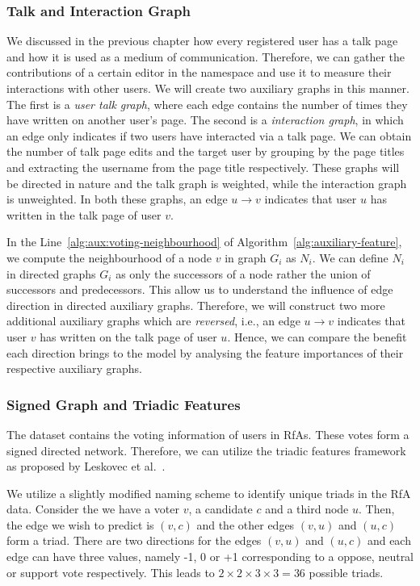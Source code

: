 \subsubsection{Talk and Interaction Graph}
\label{subsec:talk-interaction-graph}
We discussed in the previous chapter how every registered user has a talk page and how it is used as a medium of communication. 
Therefore, we can gather the contributions of a certain editor in the \usertalkNS namespace and use it to measure their interactions with other users.
We will create two auxiliary graphs in this manner.
The first is a \textit{user talk graph}, where each edge contains the number of times they have written on another user's page.
The second is a \textit{interaction graph}, in which an edge only indicates if two users have interacted via a talk page. 
We can obtain the number of talk page edits and the target user by grouping by the page titles and extracting the username from the page title respectively. 
These graphs will be directed in nature and the talk graph is weighted, while the interaction graph is unweighted. 
In both these graphs, an edge $u \rightarrow v$ indicates that user $u$ has written in the talk page of user $v$.

In the Line~\ref{alg:aux:voting-neighbourhood} of Algorithm~\ref{alg:auxiliary-feature}, we compute the neighbourhood of a node $v$ in graph $G_i$ as $N_i$.
We can define $N_i$ in directed graphs $G_i$ as only the successors of a node rather the union of successors and predecessors.
This allow us to understand the influence of edge direction in directed auxiliary graphs.
Therefore, we will construct two more additional auxiliary graphs which are \textit{reversed}, i.e., an edge $u \rightarrow v$ indicates that user $v$ has written on the talk page of user $u$.
Hence, we can compare the benefit each direction brings to the model by analysing the feature importances of their respective auxiliary graphs.

\subsubsection{Signed Graph and Triadic Features}
The \wikirfa dataset contains the voting information of users in RfAs.
These votes form a signed directed network.
Therefore, we can utilize the triadic features framework as proposed by Leskovec et al.\ \cite{leskovec2010predicting}.

We utilize a slightly modified naming scheme to identify unique triads in the RfA data.
Consider the we have a voter $v$, a candidate $c$ and a third node $u$.
Then, the edge we wish to predict is $(v,c)$ and the other edges $(v,u)$ and $(u,c)$ form a triad.
There are two directions for the edges $(v,u)$ and $(u,c)$ and each edge can have three values, namely -1, 0 or +1 corresponding to a oppose, neutral or support vote respectively.
This leads to $2 \times 2 \times 3 \times 3 = 36$ possible triads.

